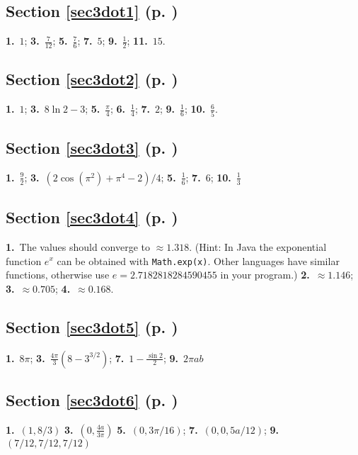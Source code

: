 \begin{multicols}{2}
\subsection*{Section \ref{sec3dot1} (p. \pageref{sec3dot1})}
\textbf{1.}~$1$;\quad
\textbf{3.}~$\frac{7}{12}$;\quad
\textbf{5.}~$\frac{7}{6}$;\quad
\textbf{7.}~$5$;\quad
\textbf{9.}~$\frac{1}{2}$;\quad
\textbf{11.}~$15$.
\subsection*{Section \ref{sec3dot2} (p. \pageref{sec3dot2})}
\textbf{1.}~$1$;\quad
\textbf{3.}~$8\ln 2 - 3$;\quad
\textbf{5.}~$\frac{\pi}{4}$;\quad
\textbf{6.}~$\frac{1}{4}$;\quad
\textbf{7.}~$2$;\quad
\textbf{9.}~$\frac{1}{6}$;\quad
\textbf{10.}~$\frac{6}{5}$.
\subsection*{Section \ref{sec3dot3} (p. \pageref{sec3dot3})}

\textbf{1.}~$\frac{9}{2}$;\quad
\textbf{3.}~$(2\cos(\pi^2) + \pi^4 -2)/4$;\quad
\textbf{5.}~$\frac{1}{6}$;\quad
\textbf{7.}~$6$; \quad
\textbf{10.}~$\frac{1}{3}$
\subsection*{Section \ref{sec3dot4} (p. \pageref{sec3dot4})}
\textbf{1.}~The values should converge to $\approx 1.318$. (Hint: In Java the exponential function $e^x$ can be obtained
with \texttt{Math.exp(x)}. Other languages have
similar functions, otherwise use $e=2.7182818284590455$ in your program.)
\textbf{2.}~$\approx 1.146$;\quad
\textbf{3.}~$\approx 0.705$;\quad
\textbf{4.}~$\approx 0.168$.
\subsection*{Section \ref{sec3dot5} (p. \pageref{sec3dot5})}

\textbf{1.}~$8\pi$;\quad
\textbf{3.}~$\frac{4\pi}{3}(8-3^{3/2})$;\quad
\textbf{7.}~$1-\frac{\sin 2}{2}$;\quad
\textbf{9.}~$2\pi ab$

\subsection*{Section \ref{sec3dot6} (p. \pageref{sec3dot6})}

\textbf{1.}~$(1,8/3)$\quad
\textbf{3.}~$(0,\frac{4a}{3\pi})$\quad
\textbf{5.}~$(0,3\pi/16)$;\quad
\textbf{7.}~$(0,0,5a/12)$;\quad
\textbf{9.}~$(7/12,7/12,7/12)$

\end{multicols}
